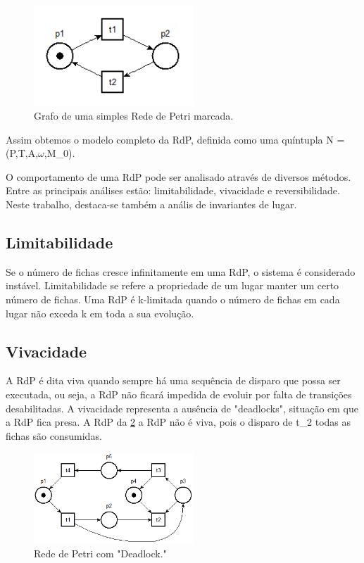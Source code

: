 \begin{figure}[!htb]
	\caption[Grafo de uma simples Rede de Petri marcada]{Grafo de uma simples Rede de Petri marcada.}
	\label{fig:rdpsimplesmarcada}
	\includegraphics[width=6cm]{./figuras/RDP_SIMPLES_MARCADA.png}\centeringli
\end{figure}

Assim obtemos o modelo completo da RdP, definida como uma qu\'intupla N = (P,T,A,$\omega$,M_0).

O comportamento de uma RdP pode ser analisado atrav\'es de diversos m\'etodos. Entre as principais an\'alises est\~ao: limitabilidade, vivacidade e reversibilidade. Neste trabalho, destaca-se tamb\'em a an\'alis de invariantes de lugar.

\subsection{Limitabilidade}

Se o n\'umero de fichas cresce infinitamente em uma RdP, o sistema \'e considerado inst\'avel. Limitabilidade se refere a propriedade de um lugar manter um certo n\'umero de fichas. Uma RdP \'e k-limitada quando o n\'umero de fichas em cada lugar n\~ao exceda k em toda a sua evolu\c{c}\~ao.

\subsection{Vivacidade}

A RdP \'e dita viva quando sempre h\'a uma sequ\^encia de disparo que possa ser executada, ou seja, a RdP n\~ao ficar\'a impedida de evoluir por falta de transi\c{c}\~oes desabilitadas. A vivacidade representa a aus\^encia de "deadlocks", situa\c{c}\~ao em que a RdP fica presa. A RdP da \ref{fig:rdpdeadlock} a RdP n\~ao \'e viva, pois o disparo de t_2 todas as fichas s\~ao consumidas.

\begin{figure}[!htb]
	\caption[Rede de Petri com deadlock]{Rede de Petri com "Deadlock."}
	\label{fig:rdpdeadlock}
	\includegraphics[width=6cm]{./figuras/RDP_DEADLOCK.png}\centering
\end{figure}

